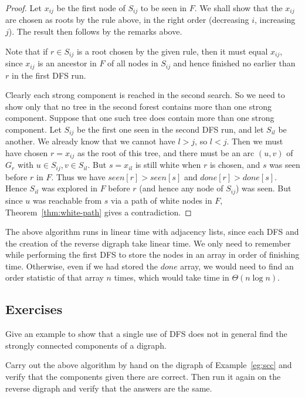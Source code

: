 \begin{proof}
Let $x_{ij}$ be the first node of $S_{ij}$ to be seen in $F$. We shall
show that the $x_{ij}$ are chosen as roots by the rule above, in the
right order (decreasing $i$, increasing $j$). The result then follows
by the remarks above.

Note that if $r\in S_{ij}$ is a root chosen by the given rule, then it
must equal $x_{ij}$, since $x_{ij}$ is an ancestor in $F$ of all nodes
in $S_{ij}$ and hence finished no earlier than $r$ in the first DFS run.

Clearly each strong component is reached in the second search. So we
need to show only that no tree in the second forest contains more than
one strong component. Suppose that one such tree does contain more than
one strong component. Let $S_{ij}$ be the first one seen in the second
DFS run, and let $S_{il}$ be another. We already know that we cannot
have $l > j$, so $l < j$. Then we must have chosen $r=x_{ij}$ as the
root of this tree, and there must be an arc $(u, v)$ of $G_r$ with $u\in
S_{ij}, v\in S_{il}$. But $s=x_{il}$ is still white when $r$ is chosen,
and $s$ was seen before $r$ in $F$. Thus we have $seen[r] > seen[s]$
and $done[r] > done[s]$. Hence $S_{il}$ was explored in $F$ before $r$
(and hence any node of $S_{ij}$) was seen. But since $u$ was reachable
from $s$ via a path of white nodes in $F$, Theorem~\ref{thm:white-path}
gives a contradiction.
\end{proof} 

The above algorithm runs in linear time with adjacency lists, since each
DFS and the creation of the reverse digraph take linear time. We only
need to remember  while performing the first DFS to store the nodes in
an array in order of finishing time. Otherwise, even if we had stored the
$done$ array, we would need to find an order statistic of that array $n$
times, which would take time in $\Theta(n\log n)$.


\subsection*{Exercises}

\begin{Exercise}
\label{ex:DFSfails}

Give an example to show that a single use of DFS does not in general find the strongly connected components of a digraph.
\end{Exercise}

\begin{Exercise}
\label{ex:dolinscc}

Carry out the above  algorithm by hand on the digraph of
Example~\ref{eg:scc} and verify that the components given there are
correct. Then run it again on the reverse digraph and verify that the
answers are the same.
\end{Exercise}


